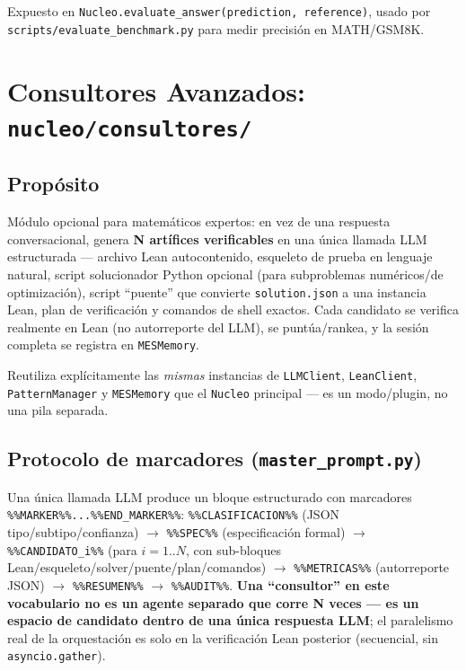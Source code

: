 \documentclass[11pt,a4paper]{report}
\newcommand{\code}[1]{\texttt{#1}}
\begin{document}
Expuesto en \code{Nucleo.evaluate_answer(prediction, reference)}, usado por \code{scripts/evaluate_benchmark.py} para medir precisi\'on en MATH/GSM8K.

\chapter{Consultores Avanzados: \code{nucleo/consultores/}}
\label{ch:consultores}

\section{Prop\'osito}

M\'odulo opcional para matem\'aticos expertos: en vez de una respuesta conversacional, genera \textbf{N art\'ifices verificables} en una \'unica llamada LLM estructurada --- archivo Lean autocontenido, esqueleto de prueba en lenguaje natural, script solucionador Python opcional (para subproblemas num\'ericos/de optimizaci\'on), script ``puente'' que convierte \code{solution.json} a una instancia Lean, plan de verificaci\'on y comandos de shell exactos. Cada candidato se verifica realmente en Lean (no autorreporte del LLM), se punt\'ua/rankea, y la sesi\'on completa se registra en \code{MESMemory}.

Reutiliza expl\'icitamente las \emph{mismas} instancias de \code{LLMClient}, \code{LeanClient}, \code{PatternManager} y \code{MESMemory} que el \code{Nucleo} principal --- es un modo/plugin, no una pila separada.

\section{Protocolo de marcadores (\code{master_prompt.py})}

Una \'unica llamada LLM produce un bloque estructurado con marcadores \code{\%\%MARKER\%\%...\%\%END\_MARKER\%\%}: \code{\%\%CLASIFICACION\%\%} (JSON tipo/subtipo/confianza) $\to$ \code{\%\%SPEC\%\%} (especificaci\'on formal) $\to$ \code{\%\%CANDIDATO\_i\%\%} (para $i=1..N$, con sub-bloques Lean/esqueleto/solver/puente/plan/comandos) $\to$ \code{\%\%METRICAS\%\%} (autorreporte JSON) $\to$ \code{\%\%RESUMEN\%\%} $\to$ \code{\%\%AUDIT\%\%}. \textbf{Una ``consultor'' en este vocabulario no es un agente separado que corre N veces --- es un espacio de candidato dentro de una \'unica respuesta LLM}; el paralelismo real de la orquestaci\'on es solo en la verificaci\'on Lean posterior (secuencial, sin \code{asyncio.gather}).
\end{document}
